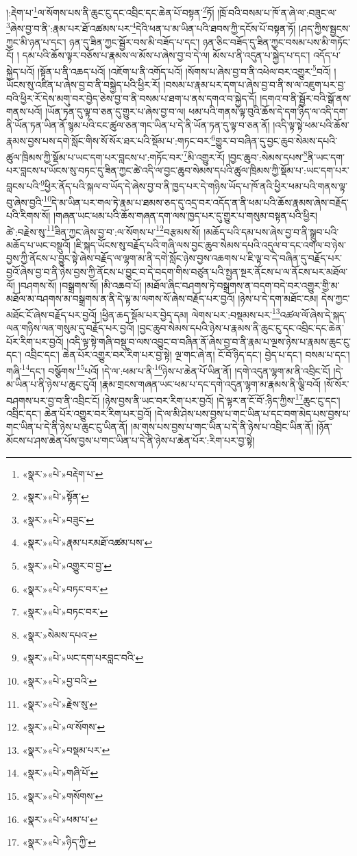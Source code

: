 །:རྡེག་པ་\footnote{«སྣར་»«པེ་»བརྡེག་པ་}ལ་སོགས་པས་ནི་ཆུང་ངུ་དང་འབྲིང་དང་ཆེན་པོ་བསྟན་\footnote{«སྣར་»«པེ་»སྟོན་}ཏོ། །ཁྲོ་བའི་བསམ་པ་ཁོ་ན་ཞེ་ལ་:བཟུང་ལ་\footnote{«སྣར་»«པེ་»བཟུང་}ཞེས་བྱ་བ་ནི་:རྣམ་པར་ཐོ་འཚམས་པར་\footnote{«སྣར་»«པེ་»རྣམ་པརམཐོ་འཚམ་པས་}དེའི་ཕན་པ་མ་ཡིན་པའི་ཐབས་ཀྱི་དངོས་པོ་བསྟན་ཏོ། །ཤད་ཀྱིས་སྦྱངས་ཀྱང་མི་ཉན་པ་དང་། ཉན་དུ་ཟིན་ཀྱང་སྦྱོར་བས་མི་བཟོད་པ་དང་། ཉན་ཅིང་བཟོད་དུ་ཟིན་ཀྱང་བསམ་པས་མི་གཏོང་ངོ། །
དམ་པའི་ཆོས་ལྟར་བཅོས་པ་རྣམས་ལ་མོས་པ་ཞེས་བྱ་བ་དེ་ལ། མོས་པ་ནི་འདུན་པ་སྐྱེད་པ་དང་། འདོད་པ་སྐྱེད་པའོ། །སྟོན་པ་ནི་འཆད་པའོ། །འཇོག་པ་ནི་འགོད་པའོ། །སོགས་པ་ཞེས་བྱ་བ་ནི་འཕེལ་བར་འགྱུར་\footnote{«སྣར་»«པེ་»འགྱུར་བ་བྱ་}བའོ། །ཡོངས་སུ་འཛིན་པ་ཞེས་བྱ་བ་ནི་བསྐྱེད་པའི་ཕྱིར་རོ། །བསམ་པ་རྣམ་པར་དག་པ་ཞེས་བྱ་བ་ནི་ས་ལ་འཇུག་པར་བྱ་བའི་ཕྱིར་རོ་དེས་མགུ་བར་བྱེད་ཅེས་བྱ་བ་ནི་བསམ་པ་ཐག་པ་ནས་དགའ་བ་སྐྱེད་དོ། །དགའ་བ་ནི་སྦྱོར་བའི་སྒོ་ནས་གནས་པའོ། །ཡོན་ཏན་དུ་ལྟ་བ་ཅན་དུ་གྱུར་པ་ཞེས་བྱ་བ་ལ། ཕམ་པའི་གནས་ལྟ་བུའི་ཆོས་དེ་དག་ཉིད་ལ་འདི་དག་ནི་ཡོན་ཏན་ཡིན་ནོ་སྙམ་པའི་ངང་ཚུལ་ཅན་གང་ཡིན་པ་དེ་ནི་ཡོན་ཏན་དུ་ལྟ་བ་ཅན་ནོ། །འདི་ལྟ་སྟེ་ཕམ་པའི་ཆོས་རྣམས་བྱས་པས་དགེ་སློང་གིས་སོ་སོར་ཐར་པའི་སྡོམ་པ་:གཏང་བར་\footnote{«སྣར་»«པེ་»བཏང་བར་}གྱུར་བ་བཞིན་དུ་བྱང་ཆུབ་སེམས་དཔའི་ཚུལ་ཁྲིམས་ཀྱི་སྡོམ་པ་ཡང་དག་པར་བླངས་པ་:གཏོང་བར་\footnote{«སྣར་»«པེ་»བཏང་བར་}མི་འགྱུར་རོ། །བྱང་ཆུབ་:སེམས་དཔས་\footnote{«སྣར་»སེམས་དཔའ་}ནི་ཡང་དག་པར་བླངས་པ་ཡོངས་སུ་བཏང་དུ་ཟིན་ཀྱང་ཚེ་འདི་ལ་བྱང་ཆུབ་སེམས་དཔའི་ཚུལ་ཁྲིམས་ཀྱི་སྡོམ་པ་:ཡང་དག་པར་བླངས་པའི་\footnote{«སྣར་»«པེ་»ཡང་དག་པརབླང་བའི་}ཕྱིར་ནོད་པའི་སྐལ་བ་ཡོད་དེ་ཞེས་བྱ་བ་ནི་ཁྱད་པར་དེ་གཉིས་ཡོད་པ་ཁོ་ནའི་ཕྱིར་ཕམ་པའི་གནས་ལྟ་བུ་ཞེས་བྱའི་\footnote{«སྣར་»«པེ་»བྱ་བའི་}དེ་མ་ཡིན་པར་གལ་ཏེ་རྣམ་པ་ཐམས་ཅད་དུ་འདྲ་བར་འདོད་ན་ནི་ཕམ་པའི་ཆོས་རྣམས་ཞེས་བརྗོད་པའི་རིགས་སོ། །གཞན་ཡང་ཕམ་པའི་ཆོས་གཞན་དག་ལས་ཁྱད་པར་དུ་གྱུར་པ་གསུམ་བསྟན་པའི་ཕྱིར། ཚེ་:བརྗེས་སུ་\footnote{«སྣར་»«པེ་»རྗེས་སུ་}ཟིན་ཀྱང་ཞེས་བྱ་བ་:ལ་སོགས་པ་\footnote{«སྣར་»«པེ་»ལ་སོགས་}བརྩམས་སོ། །མཆོད་པའི་དམ་པས་ཞེས་བྱ་བ་ནི་སྒྲུབ་པའི་མཆོད་པ་ཡང་བསྡུའོ། །ཇི་སྐད་ཡོངས་སུ་བརྗོད་པའི་གཞི་ལས་བྱང་ཆུབ་སེམས་དཔའི་འདུལ་བ་དང་འགལ་བ་ཉེས་བྱས་ཀྱི་ནོངས་པ་བྱུང་སྟེ་ཞེས་བརྗོད་ལ་ལྷག་མ་ནི་དགེ་སློང་ཉེས་བྱས་འཆགས་པ་ཇི་ལྟ་བ་དེ་བཞིན་དུ་བརྗོད་པར་བྱའོ་ཞེས་བྱ་བ་ནི་ཉེས་བྱས་ཀྱི་ནོངས་པ་བྱུང་བ་དེ་བདག་གིས་བཙུན་པའི་སྤྱན་སྔར་ནོངས་པ་ལ་ནོངས་པར་མཐོལ་ལོ། །བཤགས་སོ། །བསྒྲགས་སོ། །མི་འཆབ་པོ། །མཐོལ་ཞིང་བཤགས་ཏེ་བསྒྲགས་ན་བདག་བདེ་བར་འགྱུར་གྱི་མ་མཐོལ་མ་བཤགས་མ་བསྒྲགས་ན་ནི་དེ་ལྟ་མ་ལགས་སོ་ཞེས་བརྗོད་པར་བྱའོ། །ཉེས་པ་དེ་དག་མཐོང་ངམ། དེས་ཀྱང་མཐོང་ངོ་ཞེས་བརྗོད་པར་བྱའོ། །ཕྱིན་ཆད་སྡོམ་པར་བྱེད་དམ། ལེགས་པར་:བསྡམས་པར་\footnote{«སྣར་»«པེ་»བསྡམ་པར་}འཚལ་ལོ་ཞེས་དེ་སྐད་ལན་གཉིས་ལན་གསུམ་དུ་བརྗོད་པར་བྱའོ། །བྱང་ཆུབ་སེམས་དཔའི་ཉེས་པ་རྣམས་ནི་ཆུང་ངུ་དང་འབྲིང་དང་ཆེན་པོར་རིག་པར་བྱའོ། །འདི་ལྟ་སྟེ་གཞི་བསྡུ་བ་ལས་འབྱུང་བ་བཞིན་ནོ་ཞེས་བྱ་བ་ནི་རྣམ་པ་ལྔས་ཉེས་པ་རྣམས་ཆུང་ངུ་དང་། འབྲིང་དང་། ཆེན་པོར་འགྱུར་བར་རིག་པར་བྱ་སྟེ། ལྔ་གང་ཞེ་ན། ངོ་བོ་ཉིད་དང་། བྱེད་པ་དང་། བསམ་པ་དང་། གཞི་\footnote{«སྣར་»«པེ་»གཞི་པོ་}དང་། བསྩོགས་\footnote{«སྣར་»«པེ་»གསོགས་}པའོ། །དེ་ལ་:ཕམ་པ་ནི་\footnote{«སྣར་»«པེ་»ཕམ་པ་}ཉེས་པ་ཆེན་པོ་ཡིན་ནོ། །དགེ་འདུན་ལྷག་མ་ནི་འབྲིང་ངོ། །དེ་མ་ཡིན་པ་ནི་ཉེས་པ་ཆུང་ངུའོ། །རྣམ་གྲངས་གཞན་ཡང་ཕམ་པ་དང་དགེ་འདུན་ལྷག་མ་རྣམས་ནི་ལྕི་བའོ། །སོ་སོར་བཤགས་པར་བྱ་བ་ནི་འབྲིང་ངོ། །ཉེས་བྱས་ནི་ཡང་བར་རིག་པར་བྱའོ། །དེ་ལྟར་ན་ངོ་བོ་:ཉིད་ཀྱིས་\footnote{«སྣར་»«པེ་»ཉིད་ཀྱི་}ཆུང་ངུ་དང་། འབྲིང་དང་། ཆེན་པོར་འགྱུར་བར་རིག་པར་བྱའོ། །དེ་ལ་མི་ཤེས་པས་བྱས་པ་གང་ཡིན་པ་དང་བག་མེད་པས་བྱས་པ་གང་ཡིན་པ་དེ་ནི་ཉེས་པ་ཆུང་ངུ་ཡིན་ནོ། །མ་གུས་པས་བྱས་པ་གང་ཡིན་པ་དེ་ནི་ཉེས་པ་འབྲིང་ཡིན་ནོ། །ཉོན་མོངས་པ་ཤས་ཆེན་པོས་བྱས་པ་གང་ཡིན་པ་དེ་ནི་ཉེས་པ་ཆེན་པོར་:རིག་པར་བྱ་སྟེ། 